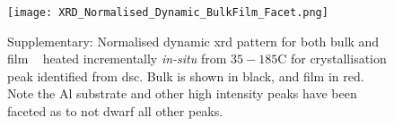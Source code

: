 \documentclass[a4paper,12pt,oneside]{article}%
\begin{document}
\begin{figure}[b]
	\centering
	\texttt{[image: XRD\_Normalised\_Dynamic\_BulkFilm\_Facet.png]}
	\caption{Supplementary: Normalised dynamic \acrshort{xrd} pattern for both bulk and film \MgZnCa~ heated incrementally \textit{in-situ} from $35-185$\degree C for crystallisation peak identified from \acrshort{dsc}. Bulk is shown in black, and film in red. Note the Al substrate and other high intensity peaks have been faceted as to not dwarf all other peaks.}
	\label{fig:XRD_Dynamic_BulkandFilm}
\end{figure}
\end{document}
